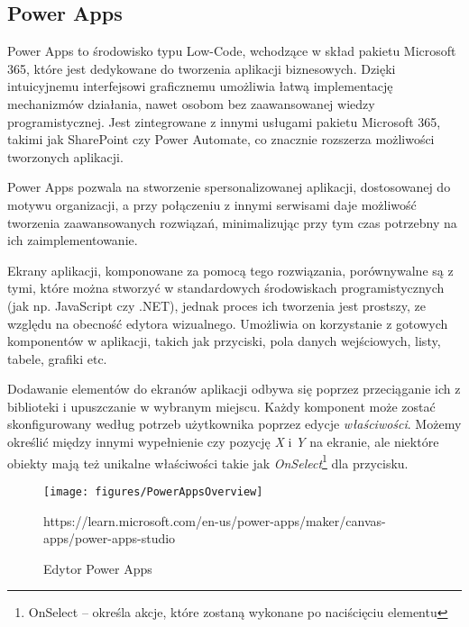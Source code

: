 \subsection{Power Apps}
Power Apps to środowisko typu Low-Code, wchodzące w skład pakietu Microsoft 365, które jest dedykowane do tworzenia aplikacji biznesowych. Dzięki intuicyjnemu interfejsowi graficznemu umożliwia łatwą implementację mechanizmów działania, nawet osobom bez zaawansowanej wiedzy programistycznej. Jest zintegrowane z innymi usługami pakietu Microsoft 365, takimi jak SharePoint czy Power Automate, co znacznie rozszerza możliwości tworzonych aplikacji.

Power Apps pozwala na stworzenie spersonalizowanej aplikacji, dostosowanej do motywu organizacji, a przy połączeniu z innymi serwisami daje możliwość tworzenia zaawansowanych rozwiązań, minimalizując przy tym czas potrzebny na ich zaimplementowanie.

Ekrany aplikacji, komponowane za pomocą tego rozwiązania, porównywalne są z tymi, które można stworzyć w standardowych środowiskach programistycznych (jak np. JavaScript czy .NET), jednak proces ich tworzenia jest prostszy, ze względu na obecność edytora wizualnego. Umożliwia on korzystanie z gotowych komponentów w aplikacji, takich jak przyciski, pola danych wejściowych, listy, tabele, grafiki etc.

Dodawanie elementów do ekranów aplikacji odbywa się poprzez przeciąganie ich z biblioteki i upuszczanie w wybranym miejscu. Każdy komponent może zostać skonfigurowany według potrzeb użytkownika poprzez edycje \emph{właściwości}. Możemy określić między innymi wypełnienie czy pozycję \emph{X} i \emph{Y} na ekranie, ale niektóre obiekty mają też unikalne właściwości takie jak \emph{OnSelect}\footnote{OnSelect -- określa akcje, które zostaną wykonane po naciścięciu elementu} dla przycisku.


\newpage

\begin{figure}[h]
    \centering
    \texttt{[image: figures/PowerAppsOverview]}
    \caption{Edytor Power Apps \cite{microsoftPowerApps}} https://learn.microsoft.com/en-us/power-apps/maker/canvas-apps/power-apps-studio
    \label{fig:PowerAppsEditorOverview}
\end{figure}


